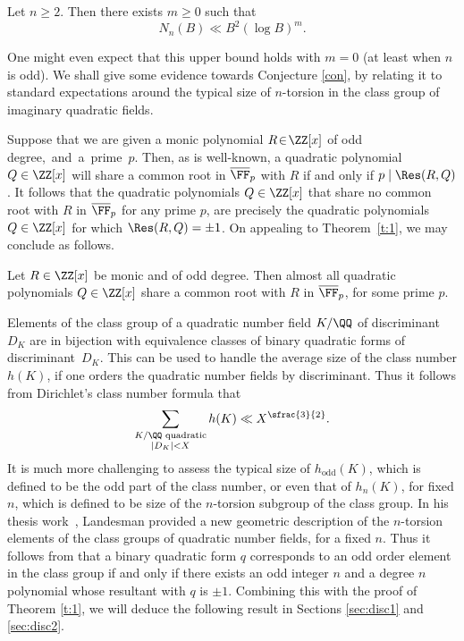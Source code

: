 \begin{conjecture}[Landesman]\label{con}
Let $n\geq 2$. Then there exists $m\geq 0$ such that
\[
N_n(B)\ll B^{2}(\log B)^m.
\]
\end{conjecture}

One might even expect that this upper bound holds with $m=0$ (at least when $n$ is odd).
We shall give some evidence towards Conjecture \ref{con}, by relating it to standard expectations around the typical size of $n$-torsion in the class group of imaginary quadratic fields.

Suppose that we are given a monic polynomial $R\!\in\! \ZZ[x]$ of odd degree,~and~a~prime~$p$. Then,
as is well-known, a quadratic polynomial $Q\in \ZZ[x]$ will share
a common root in $\overline\FF_p$ with $R$ if and only if
$p\mid \Res(R,Q)$. It follows that the
quadratic polynomials $Q\in \ZZ[x]$ that share no
common root with $R$ in
$\overline\FF_p$ for any prime $p$, are precisely the
quadratic polynomials $Q\in \ZZ[x]$ for which $\Res(R,Q)=\pm 1$.
On appealing to Theorem~\ref{t:1}, we may conclude as follows.

\begin{corollary}
Let
$R\in \ZZ[x]$ be monic and of odd degree. Then almost all quadratic polynomials
$Q\in \ZZ[x]$ share a common root with $R$ in $\overline\FF_p$, for some prime $p$.
\end{corollary}

Elements of the
class group of a quadratic number field $K/\QQ$ of discriminant $D_K$ are in bijection with equivalence classes
of binary quadratic forms of discriminant~$D_K$. This can be used to
handle the average size of the class number $h(K)$, if one orders the quadratic number fields by discriminant. Thus it follows from Dirichlet's class number formula that
\begin{equation}\label{eq:class}
\sum_{
\substack{K/\QQ \text{ quadratic}\\
|D_K| < X
}} h(K)\ll X^{\sfrac{3}{2}}.
\end{equation}
It is much more challenging to assess the typical size of
$h_\text{odd}(K)$, which is defined to be the odd part of the class number, or even that of
$h_n(K)$, for fixed $n$, which is defined to be size of the $n$-torsion subgroup of the class group.
In his thesis work~\cite{aaron}, Landesman provided
a new geometric description of the $n$-torsion elements of the class groups of quadratic number fields, for a fixed $n$. Thus it follows from
\cite[Th.\,1.1]{aaron} that a binary quadratic form $q$ corresponds to an odd order
element in the class group
if and only if there exists an odd integer $n$
and a degree $n$ polynomial whose resultant with $q$ is $\pm 1$. Combining this with the proof of
Theorem \ref{t:1}, we will deduce the following result in Sections \ref{sec:disc1} and \ref{sec:disc2}.

